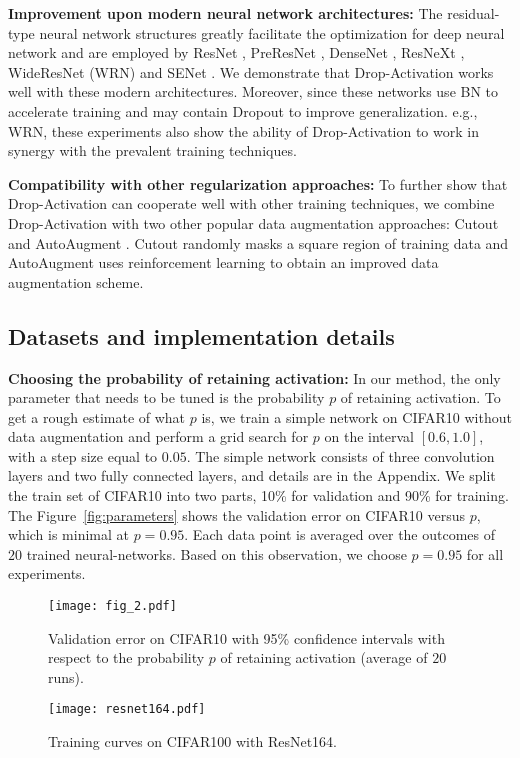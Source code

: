\documentclass[11pt]{article}
\begin{document}
\textbf{Improvement upon modern neural network architectures:} The residual-type neural network structures greatly facilitate the optimization for deep neural network \cite{resnet} and are employed by ResNet \cite{resnet}, PreResNet \cite{preresnet}, DenseNet \cite{densenet}, ResNeXt \cite{resnext}, WideResNet (WRN)\cite{wrn} and SENet \cite{se}. We demonstrate that Drop-Activation works well with these modern architectures. Moreover, since these networks use BN to accelerate training and may contain Dropout to improve generalization. e.g., WRN, these experiments also show the ability of Drop-Activation to work in synergy with the prevalent training techniques.

\textbf{Compatibility with other regularization approaches:} To further show that Drop-Activation can cooperate well with other training techniques, we combine Drop-Activation with two other popular data augmentation approaches: Cutout \cite{cutout} and AutoAugment \cite{autoaugment}. Cutout randomly masks a square region of training data and AutoAugment uses reinforcement learning to obtain an improved data augmentation scheme.

\subsection{Datasets and implementation details}
\label{subsec:dataset}
\textbf{Choosing the probability of retaining activation:}
In our method, the only parameter that needs to be tuned is the probability $p$ of retaining activation. To get a rough estimate of what $p$ is, we train a simple network on CIFAR10 without data augmentation and perform a grid search for $p$ on the interval $[0.6, 1.0]$, with a step size equal to $0.05$. The simple network consists of three convolution layers and two fully connected layers, and details are in the Appendix. We split the train set of CIFAR10 into two parts, 10\% for validation and 90\% for training. The Figure~\ref{fig:parameters} shows the validation error on CIFAR10 versus $p$, which is minimal at $p=0.95$. Each data point is averaged over the outcomes of $20$ trained neural-networks. Based on this observation, we choose $p=0.95$ for all experiments.

\begin{figure}
\centering
\begin{minipage}[t]{0.4\textwidth}
\vspace{0pt}
\texttt{[image: fig\_2.pdf]}
\caption{Validation error on CIFAR10 with 95\% confidence intervals with respect to the probability $p$ of retaining activation (average of $20$ runs).}
\label{fig:parameters}
\end{minipage}
\hspace{.3in}
\begin{minipage}[t]{0.4\textwidth}
\vspace{0pt}
\texttt{[image: resnet164.pdf]}
\caption{Training curves on CIFAR100 with ResNet164.}
\label{fig:resnet-164}
\end{minipage}

\vspace{-0.4cm}
\end{figure}
\end{document}
